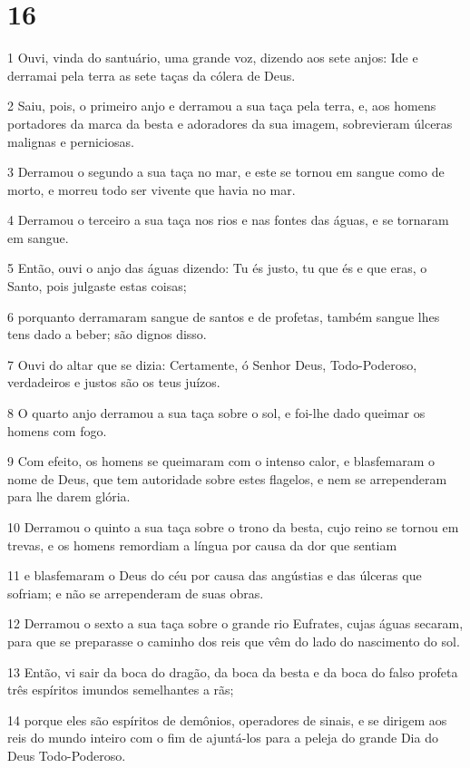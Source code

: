 \chapter{16}

\par 1 Ouvi, vinda do santuário, uma grande voz, dizendo aos sete anjos: Ide e derramai pela terra as sete taças da cólera de Deus.
\par 2 Saiu, pois, o primeiro anjo e derramou a sua taça pela terra, e, aos homens portadores da marca da besta e adoradores da sua imagem, sobrevieram úlceras malignas e perniciosas.
\par 3 Derramou o segundo a sua taça no mar, e este se tornou em sangue como de morto, e morreu todo ser vivente que havia no mar.
\par 4 Derramou o terceiro a sua taça nos rios e nas fontes das águas, e se tornaram em sangue.
\par 5 Então, ouvi o anjo das águas dizendo: Tu és justo, tu que és e que eras, o Santo, pois julgaste estas coisas;
\par 6 porquanto derramaram sangue de santos e de profetas, também sangue lhes tens dado a beber; são dignos disso.
\par 7 Ouvi do altar que se dizia: Certamente, ó Senhor Deus, Todo-Poderoso, verdadeiros e justos são os teus juízos.
\par 8 O quarto anjo derramou a sua taça sobre o sol, e foi-lhe dado queimar os homens com fogo.
\par 9 Com efeito, os homens se queimaram com o intenso calor, e blasfemaram o nome de Deus, que tem autoridade sobre estes flagelos, e nem se arrependeram para lhe darem glória.
\par 10 Derramou o quinto a sua taça sobre o trono da besta, cujo reino se tornou em trevas, e os homens remordiam a língua por causa da dor que sentiam
\par 11 e blasfemaram o Deus do céu por causa das angústias e das úlceras que sofriam; e não se arrependeram de suas obras.
\par 12 Derramou o sexto a sua taça sobre o grande rio Eufrates, cujas águas secaram, para que se preparasse o caminho dos reis que vêm do lado do nascimento do sol.
\par 13 Então, vi sair da boca do dragão, da boca da besta e da boca do falso profeta três espíritos imundos semelhantes a rãs;
\par 14 porque eles são espíritos de demônios, operadores de sinais, e se dirigem aos reis do mundo inteiro com o fim de ajuntá-los para a peleja do grande Dia do Deus Todo-Poderoso.
